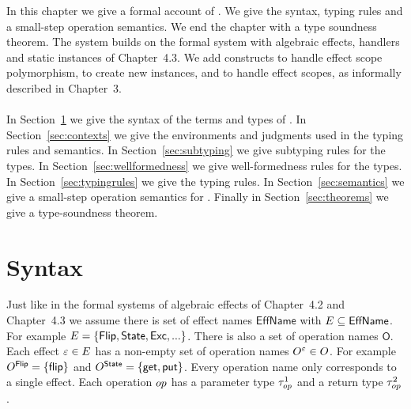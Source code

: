 {%

In this chapter we give a formal account of \lang{}.
We give the syntax, typing rules and a small-step operation semantics.
We end the chapter with a type soundness theorem.
The system builds on the formal system with algebraic effects, handlers and static instances of Chapter~4.3.
We add constructs to handle effect scope polymorphism, to create new instances, and to handle effect scopes, as informally described in Chapter~3.
\\\\
In Section~\ref{sec:syntax} we give the syntax of the terms and types of \lang{}.
In Section~\ref{sec:contexts} we give the environments and judgments used in the typing rules and semantics.
In Section~\ref{sec:subtyping} we give subtyping rules for the types.
In Section~\ref{sec:wellformedness} we give well-formedness rules for the types.
In Section~\ref{sec:typingrules} we give the typing rules.
In Section~\ref{sec:semantics} we give a small-step operation semantics for \lang{}.
Finally in Section~\ref{sec:theorems} we give a type-soundness theorem.

\section{Syntax}
\label{sec:syntax}
Just like in the formal systems of algebraic effects of Chapter~4.2 and Chapter~4.3
we assume there is set of effect names $\mathsf{EffName}$ with $E \subseteq \mathsf{EffName}$.
For example $E = \{ \mathsf{Flip}, \mathsf{State}, \mathsf{Exc}, ... \}$.
There is also a set of operation names $\mathsf{O}$.
Each effect $\varepsilon \in E$ has a non-empty set of operation names $O^{\varepsilon} \in O$.
For example $O^{\mathsf{Flip}} = \{\mathsf{flip}\}$ and $O^{\mathsf{State}} = \{\mathsf{get}, \mathsf{put}\}$.
Every operation name only corresponds to a single effect.
Each operation $op$ has a parameter type $\tau^1_{op}$ and a return type $\tau^2_{op}$.

}
